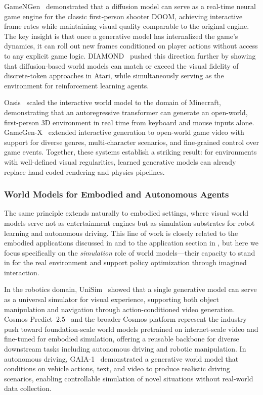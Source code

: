 GameNGen~\citep{valevski2024gamenngen} demonstrated that a diffusion model can serve as a real-time neural game engine for the classic first-person shooter DOOM, achieving interactive frame rates while maintaining visual quality comparable to the original engine. The key insight is that once a generative model has internalized the game's dynamics, it can roll out new frames conditioned on player actions without access to any explicit game logic. DIAMOND~\citep{alonso2024diamond} pushed this direction further by showing that diffusion-based world models can match or exceed the visual fidelity of discrete-token approaches in Atari, while simultaneously serving as the environment for reinforcement learning agents.

Oasis~\citep{oasis2024} scaled the interactive world model to the domain of Minecraft, demonstrating that an autoregressive transformer can generate an open-world, first-person 3D environment in real time from keyboard and mouse inputs alone. GameGen-X~\citep{che2025gamegenx} extended interactive generation to open-world game video with support for diverse genres, multi-character scenarios, and fine-grained control over game events. Together, these systems establish a striking result: for environments with well-defined visual regularities, learned generative models can already replace hand-coded rendering and physics pipelines.

\subsubsection{World Models for Embodied and Autonomous Agents}

The same principle extends naturally to embodied settings, where visual world models serve not as entertainment engines but as simulation substrates for robot learning and autonomous driving. This line of work is closely related to the embodied applications discussed in  and to the application section in , but here we focus specifically on the \emph{simulation} role of world models---their capacity to stand in for the real environment and support policy optimization through imagined interaction.

In the robotics domain, UniSim~\citep{yang2024unisim} showed that a single generative model can serve as a universal simulator for visual experience, supporting both object manipulation and navigation through action-conditioned video generation. Cosmos Predict~2.5~\citep{CosmosPredict} and the broader Cosmos platform represent the industry push toward foundation-scale world models pretrained on internet-scale video and fine-tuned for embodied simulation, offering a reusable backbone for diverse downstream tasks including autonomous driving and robotic manipulation. In autonomous driving, GAIA-1~\citep{hu2024gaia1} demonstrated a generative world model that conditions on vehicle actions, text, and video to produce realistic driving scenarios, enabling controllable simulation of novel situations without real-world data collection.

